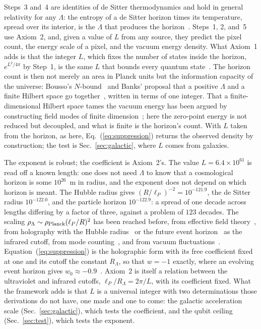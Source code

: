 \documentclass[aps,prd,twocolumn,superscriptaddress,nofootinbib,showkeys]{revtex4-2}
\begin{document}
Steps~3 and~4 are identities of de Sitter thermodynamics and hold in general relativity for any $\Lambda$: the entropy of a de Sitter horizon times its temperature, spread over its interior, is the $\Lambda$ that produces the horizon~\cite{padmanabhan2002}. Steps~1, 2, and~5 use Axiom~2, and, given a value of $L$ from any source, they predict the pixel count, the energy scale of a pixel, and the vacuum energy density. What Axiom~1 adds is that the integer $L$, which fixes the number of states inside the horizon, $e^{L^2/4\pi}$ by Step~1, is the same $L$ that bounds every quantum state~\cite{korytko2026c}. The horizon count is then not merely an area in Planck units but the information capacity of the universe: Bousso's $N$-bound~\cite{bousso2000} and Banks' proposal that a positive $\Lambda$ and a finite Hilbert space go together~\cite{banks2000}, written in terms of one integer. That a finite-dimensional Hilbert space tames the vacuum energy has been argued by constructing field modes of finite dimension~\cite{cao2019}; here the zero-point energy is not reduced but decoupled, and what is finite is the horizon's count. With $L$ taken from the horizon, as here, Eq.~(\ref{eq:suppression}) returns the observed density by construction; the test is Sec.~\ref{sec:galactic}, where $L$ comes from galaxies.

The exponent is robust; the coefficient is Axiom~2's. The value $L = 6.4\times10^{61}$ is read off a known length: one does not need $\Lambda$ to know that a cosmological horizon is some $10^{26}$~m in radius, and the exponent does not depend on which horizon is meant. The Hubble radius gives $(R/\ell_P)^{-2}=10^{-121.9}$, the de Sitter radius $10^{-122.0}$, and the particle horizon $10^{-122.9}$: a spread of one decade across lengths differing by a factor of three, against a problem of $123$ decades. The scaling $\rho_\Lambda\sim\rho_{\rm Planck}(\ell_P/R)^2$ has been reached before, from effective field theory~\cite{ckn1999}, from holography with the Hubble radius~\cite{hsu2004} or the future event horizon~\cite{li2004} as the infrared cutoff, from mode counting~\cite{gurzadyan2003,hpadmanabhan2013}, and from vacuum fluctuations~\cite{padmanabhan2005}. Equation~(\ref{eq:suppression}) is the holographic form with its free coefficient fixed at one and its cutoff the constant $R_\Lambda$, so that $w = -1$ exactly, where an evolving event horizon gives $w_0\approx-0.9$~\cite{li2004}. Axiom~2 is itself a relation between the ultraviolet and infrared cutoffs, $\ell_P/R_\Lambda = 2\pi/L$, with its coefficient fixed. What the framework adds is that $L$ is a universal integer with two determinations those derivations do not have, one made and one to come: the galactic acceleration scale (Sec.~\ref{sec:galactic}), which tests the coefficient, and the qubit ceiling (Sec.~\ref{sec:test}), which tests the exponent.
\end{document}
